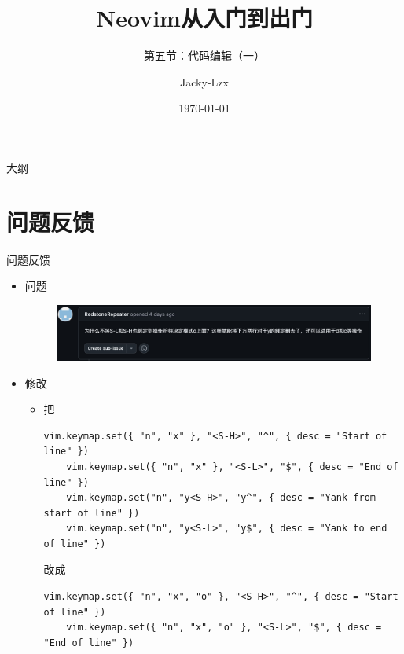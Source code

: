 \documentclass[aspectratio=169]{ctexbeamer}
\title{Neovim从入门到出门}
\subtitle{第五节：代码编辑（一）}
\author{Jacky-Lzx}
\date{\today}
\begin{document}
\begin{frame}
  \titlepage
\end{frame}

\begin{frame}{大纲}
  \tableofcontents
\end{frame}


\section{问题反馈}
  \begin{frame}[fragile]{问题反馈}

    \begin{itemize}
      \item 问题\\
        \begin{figure}[H]
          \centering
          \includegraphics[width=0.8\linewidth]{./Figures/Issue.jpg}
        \end{figure}
      \item 修改\\
        \begin{itemize}
          \item 把
            \begin{lstlisting}[basicstyle=\tiny\ttfamily]
    vim.keymap.set({ "n", "x" }, "<S-H>", "^", { desc = "Start of line" })
    vim.keymap.set({ "n", "x" }, "<S-L>", "$", { desc = "End of line" })
    vim.keymap.set("n", "y<S-H>", "y^", { desc = "Yank from start of line" })
    vim.keymap.set("n", "y<S-L>", "y$", { desc = "Yank to end of line" })
            \end{lstlisting}
            改成
            \begin{lstlisting}[basicstyle=\tiny\ttfamily]
    vim.keymap.set({ "n", "x", "o" }, "<S-H>", "^", { desc = "Start of line" })
    vim.keymap.set({ "n", "x", "o" }, "<S-L>", "$", { desc = "End of line" })
            \end{lstlisting}
        \end{itemize}
    \end{itemize}
  \end{frame}
\end{document}
